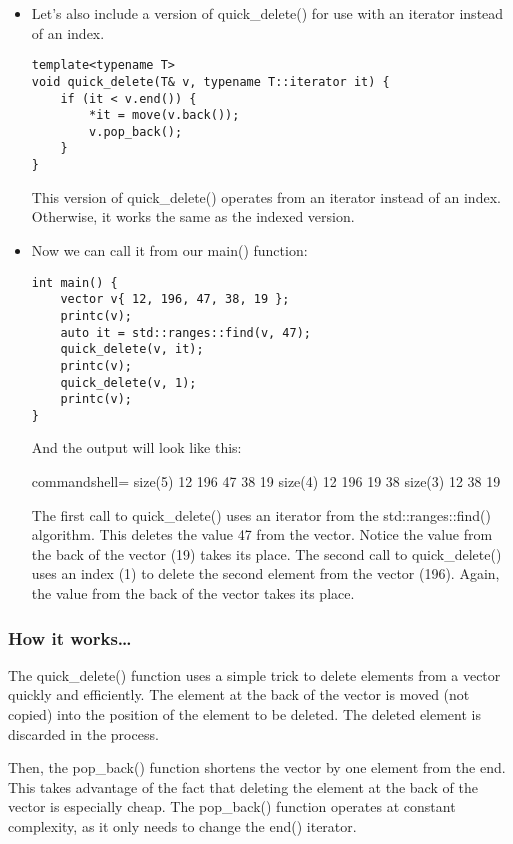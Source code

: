 \begin{itemize}
\item 
Let's also include a version of quick\_delete() for use with an iterator instead of an index.

\begin{lstlisting}[style=styleCXX]
template<typename T>
void quick_delete(T& v, typename T::iterator it) {
	if (it < v.end()) {
		*it = move(v.back());
		v.pop_back();
	}
}
\end{lstlisting}

This version of quick\_delete() operates from an iterator instead of an index.
Otherwise, it works the same as the indexed version.

\item 
Now we can call it from our main() function:

\begin{lstlisting}[style=styleCXX]
int main() {
	vector v{ 12, 196, 47, 38, 19 };
	printc(v);
	auto it = std::ranges::find(v, 47);
	quick_delete(v, it);
	printc(v);
	quick_delete(v, 1);
	printc(v);
}
\end{lstlisting}

And the output will look like this:

\begin{tcblisting}{commandshell={}}
size(5) 12 196 47 38 19
size(4) 12 196 19 38
size(3) 12 38 19
\end{tcblisting}

The first call to quick\_delete() uses an iterator from the std::ranges::find() algorithm. This deletes the value 47 from the vector. Notice the value from the back of the vector (19) takes its place. The second call to quick\_delete() uses an index (1) to delete the second element from the vector (196). Again, the value from the back of the vector takes its place.
\end{itemize}

\subsubsection{How it works…}

The quick\_delete() function uses a simple trick to delete elements from a vector quickly and efficiently. The element at the back of the vector is moved (not copied) into the position of the element to be deleted. The deleted element is discarded in the process.

Then, the pop\_back() function shortens the vector by one element from the end.
This takes advantage of the fact that deleting the element at the back of the vector is especially cheap. The pop\_back() function operates at constant complexity, as it only needs to change the end() iterator.

